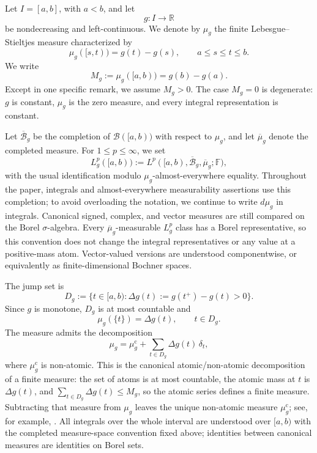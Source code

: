 \documentclass[preprint,12pt]{elsarticle}
\newenvironment{revision}{\begingroup\color{red}}{\endgroup}
\newenvironment{revision}{}{}
\newenvironment{finalrevision}{\begingroup\color{red}}{\endgroup}
\newenvironment{finalrevision}{}{}
\theoremstyle{definition}
\theoremstyle{remark}
\newcommand{\R}{\mathbb R}
\newcommand{\F}{\mathbb F}
\newcommand{\mug}{\mu_g}
\begin{document}
Let $I=[a,b]$, with $a<b$, and let
\[
 g:I\longrightarrow\R
\]
be nondecreasing and left-continuous. We denote by $\mug$ the finite Lebesgue--Stieltjes measure characterized by
\begin{equation}\label{eq:measure-definition}
 \mug([s,t))=g(t)-g(s),\qquad a\le s\le t\le b.
\end{equation}
We write
\[
 M_g:=\mug([a,b))=g(b)-g(a).
\]
Except in one specific remark, we assume $M_g>0$. The case $M_g=0$ is degenerate: $g$ is constant, $\mug$ is the zero measure, and every integral representation is constant.

\begin{revision}
\begin{finalrevision}
Let \(\overline{\mathcal B}_g\) be the completion of
\(\mathcal B([a,b))\) with respect to \(\mu_g\), and let
\(\overline{\mu}_g\) denote the completed measure. For
\(1\le p\le\infty\), we set
\[
 L_g^p([a,b))
 :=L^p([a,b),\overline{\mathcal B}_g,\overline{\mu}_g;\F),
\]
with the usual identification modulo \(\mu_g\)-almost-everywhere equality.
Throughout the paper, integrals and almost-everywhere measurability assertions
use this completion; to avoid overloading the notation, we continue to write
\(d\mu_g\) in integrals. Canonical signed, complex, and vector measures are
still compared on the Borel \(\sigma\)-algebra. Every
\(\overline{\mu}_g\)-measurable \(L_g^p\) class has a Borel representative, so
this convention does not change the integral representatives or any value at a
positive-mass atom. Vector-valued versions are understood componentwise, or
equivalently as finite-dimensional Bochner spaces.
\end{finalrevision}
\end{revision}

The jump set is
\[
 D_g:=\{t\in[a,b):\Delta g(t):=g(t^+)-g(t)>0\}.
\]
Since $g$ is monotone, $D_g$ is at most countable and
\begin{equation}\label{eq:atom-mass}
 \mug(\{t\})=\Delta g(t),\qquad t\in D_g.
\end{equation}
The measure admits the decomposition
\begin{equation}\label{eq:measure-decomp}
 \mug=\mu_g^{\mathrm c}+\sum_{t\in D_g}\Delta g(t)\,\delta_t,
\end{equation}
\begin{revision}
where \(\mu_g^{\mathrm c}\) is non-atomic.  This is the canonical
atomic/non-atomic decomposition of a finite measure: the set of atoms is at most
countable, the atomic mass at \(t\) is \(\Delta g(t)\), and
\(\sum_{t\in D_g}\Delta g(t)\le M_g\), so the atomic series defines a
finite measure.  Subtracting that measure from \(\mu_g\) leaves the unique
non-atomic measure \(\mu_g^{\mathrm c}\); see, for example,
\cite{Bartle1995}.  All integrals over the whole interval are
understood over \([a,b)\) with the completed measure-space convention fixed
above; identities between canonical measures are identities on Borel sets.
\end{revision}
\end{document}
